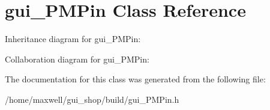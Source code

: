 \hypertarget{classgui__PMPin}{}\section{gui\+\_\+\+P\+M\+Pin Class Reference}
\label{classgui__PMPin}


Inheritance diagram for gui\+\_\+\+P\+M\+Pin\+:


Collaboration diagram for gui\+\_\+\+P\+M\+Pin\+:


The documentation for this class was generated from the following file\+:\begin{DoxyCompactItemize}
\item 
/home/maxwell/gui\+\_\+shop/build/gui\+\_\+\+P\+M\+Pin.\+h\end{DoxyCompactItemize}
